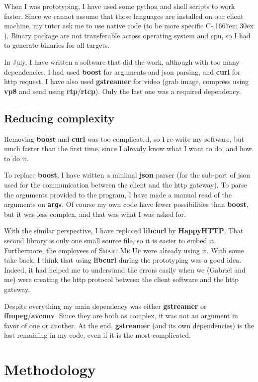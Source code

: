 \documentclass[a4paper,11pt]{custom}
\newcommand{\smu}{\textsc{Smart Me Up}\xspace}
\newcommand{\rtp}{\textbf{rtp}\xspace}
\newcommand{\rtcp}{\textbf{rtcp}\xspace}
\newcommand{\avconv}{\textbf{avconv}\xspace}
\newcommand{\ffmpeg}{\textbf{ffmpeg}\xspace}
\newcommand{\gstreamer}{\textbf{gstreamer}\xspace}
\newcommand{\curl}{\textbf{curl}\xspace}
\newcommand{\boost}{\textbf{boost}\xspace}
\newcommand{\happyhttp}{\textbf{HappyHTTP}\xspace}
\newcommand{\libcurl}{\textbf{libcurl}\xspace}
\newcommand{\vpx}{\textbf{vp8}\xspace}
\newcommand{\cpp}{%
  C\kern-.1667em\raise.30ex\hbox{\smaller{++}}%
  \spacefactor1000\xspace%
}
\newcommand{\json}{\textbf{json}\xspace}
\begin{document}
When I was prototyping, I have used some python and shell scripts to work
faster. Since we cannot assume that those languages are installed on our client
machine, my tutor ask me to use native code (to be more specific \cpp). Binary
package are not transferable across operating system and cpu, so I had to
generate binaries for all targets.

In July, I have written a software that did the work, although with too many
dependencies. I had used \boost{} for arguments and json parsing, and \curl{}
for http request. I have also used \gstreamer{} for video (grab image, compress
using \vpx{} and send using \rtp/\rtcp). Only the last one was a required
dependency.

\subsection{Reducing complexity}
\label{sec:complexity}

Removing \boost{} and \curl{} was too complicated, so I re-write my software,
but much faster than the first time, since I already know what I want to do, and
how to do it.

To replace \boost{}, I have written a minimal \json{} parser (for the sub-part of
json used for the communication between the client and the http gateway).
To parse the arguments provided to the program, I have made a manual read of
the arguments on \verb+argv+. Of course my own code have fewer possibilities than
\boost{}, but it was less complex, and that was what I was asked for.

With the similar perspective, I have replaced \libcurl{} by \happyhttp. That second
library is only one small source file, so it is easier to embed it. Furthermore,
the employees of \smu{} were already using it. With some take back, I think that
using \libcurl{} during the prototyping was a good idea. Indeed, it had helped me to
understand the errors easily when we (Gabriel and me) were creating the http
protocol between the client software and the http gateway.

Despite everything my main dependency was either \gstreamer{} or
\ffmpeg/\avconv. Since they are both as complex, it was not an argument in
favor of one or another. At the end, \gstreamer{} (and its own dependencies) is
the last remaining in my code, even if it is the most complicated.

\section{Methodology}
\end{document}
